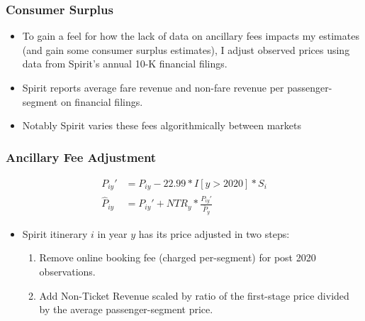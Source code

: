 \documentclass[xcolor=dvipsnames]{beamer}
\begin{document}
    \begin{frame}
        \frametitle{Consumer Surplus}
        \begin{itemize}
            \item To gain a feel for how the lack of data on ancillary fees impacts my estimates (and gain some consumer surplus estimates), I adjust observed prices using data from Spirit's annual 10-K financial filings.
            \item Spirit reports average fare revenue and non-fare revenue per passenger-segment on financial filings.
            \item Notably Spirit varies these fees  algorithmically between markets
        \end{itemize}
    \end{frame}

    \begin{frame}
        \frametitle{Ancillary Fee Adjustment}
    \begin{equation*}
    \begin{split}
      P_{iy}' &= P_{iy} - 22.99 * I[y > 2020] * S_{i}\\
     \hat{P}_{iy} &= P_{iy}' + NTR_{y} * \frac{P_{iy}'}{\bar{P}_{y}} 
    \end{split}
    \end{equation*} 
        
        \begin{itemize}
            \item Spirit itinerary $i$ in year $y$ has its price adjusted in two steps: 
            \begin{enumerate}
                \item Remove online booking fee (charged per-segment) for post 2020 observations.
                \item Add Non-Ticket Revenue scaled by ratio of the first-stage price divided by the average passenger-segment price. 
            \end{enumerate}
        \end{itemize}
    \end{frame}
\end{document}

